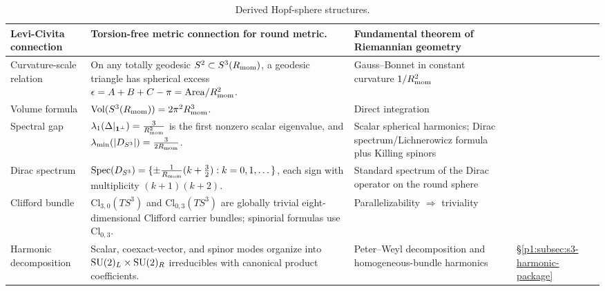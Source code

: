 \documentclass[11pt]{article}
\begin{document}
\begin{table}[htbp]
\begin{tabular}{|
  L{3.1cm}|
  L{\dimexpr\linewidth-3.1cm-4.3cm-1.0cm-8\arrayrulewidth\relax}|
  L{4.3cm}|
  C{1.0cm}|
}
Levi-Civita connection
& Torsion-free metric connection for round metric.
& Fundamental theorem of Riemannian geometry
& \cite{levi1927fondamenti} \\
\hline

Curvature-scale relation
& On any totally geodesic \(S^2\subset S^3(R_{\mathrm{mom}})\), a geodesic triangle has spherical excess
\(\epsilon=A+B+C-\pi=\mathrm{Area}/R_{\mathrm{mom}}^2\).
& Gauss--Bonnet in constant curvature \(1/R_{\mathrm{mom}}^2\)
& \cite{do1992riemannian} \\
\hline

Volume formula
& \(\mathrm{Vol}(S^3(R_{\mathrm{mom}})) = 2\pi^2 R_{\mathrm{mom}}^3\).
& Direct integration
& \cite{do1992riemannian} \\
\hline

Spectral gap
& \(\lambda_1(\Delta|_{\mathbf 1^\perp}) = \frac{3}{R_{\mathrm{mom}}^2}\) is the first nonzero scalar eigenvalue, and
\(\lambda_{\min}(|D_{S^3}|)=\frac{3}{2R_{\mathrm{mom}}}\).
& Scalar spherical harmonics; Dirac spectrum/\allowbreak Lichnerowicz formula plus Killing spinors
& \cite{lichnerowicz1963spineurs} \\
\hline

Dirac spectrum
& \(\mathrm{Spec}(D_{S^3}) =
\{\pm\frac{1}{R_{\mathrm{mom}}}(k+\frac{3}{2}) : k=0,1,\dots\}\), each sign with multiplicity \((k+1)(k+2)\).
& Standard spectrum of the Dirac operator on the round sphere
& \cite{Friedrich1997} \\
\hline

Clifford bundle
& \(\mathrm{Cl}_{3,0}(TS^3)\) and \(\mathrm{Cl}_{0,3}(TS^3)\) are globally trivial eight-dimensional Clifford carrier bundles; spinorial formulas use \(\mathrm{Cl}_{0,3}\).
& Parallelizability \(\Rightarrow\) triviality
& \cite{lawson1989spin} \\
\hline

Harmonic decomposition
& Scalar, coexact-vector, and spinor modes organize into
  \(\mathrm{SU}(2)_L\times \mathrm{SU}(2)_R\) irreducibles with canonical product coefficients.
& Peter--\allowbreak Weyl decomposition and homogeneous-bundle harmonics
& \S\ref{p1:subsec:s3-harmonic-package} \\
\hline

\end{tabular}

\caption[Derived Hopf-sphere structures]{Derived Hopf-sphere structures.}
\label{p1:tab:derived-structures}
\endgroup
\end{table}
\end{document}
